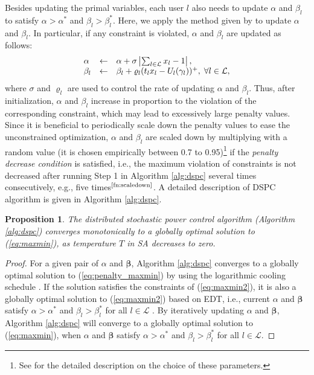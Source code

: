 \documentclass[10pt,journal,letterpaper,compsoc]{IEEEtran}
\newtheorem{prop}{\textbf{Proposition}}[section]
\begin{document}
{{Besides updating the primal variables, each user $l$ also needs to update $\alpha$ and $\beta_l$ to satisfy $\alpha>\alpha^*$ and $\beta_l>\beta^*_l$. Here, we apply the method given by \cite{chen:2008} to update $\alpha$ and $\beta_l$. In particular, if any constraint is violated, $\alpha$ and $\beta_l$ are updated as follows:
\begin{equation}\begin{array}
[c]{lll}\alpha&\leftarrow& \alpha+\sigma\left|\sum_{l\in\mathcal{L}} x_l-1\right|,
\\
\beta_l&\leftarrow& \beta_l+\varrho_l(t_lx_l- U_l(\gamma_l))^{+}, \; \forall l\in \mathcal{L},
\end{array}
\label{eq:penalty_variables}
\end{equation}
where $\sigma$ and $\varrho_l$ are used to control the rate of updating $\alpha$ and $\beta_l$. Thus, after initialization, $\alpha$ and $\beta_l$ increase in proportion to the violation of the corresponding constraint, which may lead to excessively large penalty values. Since it is beneficial to periodically scale down the penalty values to ease the unconstrained optimization, $\alpha$ and $\beta_l$ are scaled down by multiplying with a random value (it is chosen empirically between 0.7 to 0.95){\footnote{See \cite{chen:2008} for the detailed description on the choice of these parameters.\label{fn:scaledown}}} if the \emph{penalty decrease condition} is satisfied, i.e., the maximum violation of constraints is not decreased after running Step 1 in Algorithm \ref{alg:dspc} several times consecutively, e.g., five times$^\text{\ref{fn:scaledown}}$. A detailed description of DSPC algorithm is given in Algorithm \ref{alg:dspc}.

\begin{prop}
The distributed stochastic power control algorithm (Algorithm \ref{alg:dspc}) converges monotonically to a globally optimal solution to (\ref{eq:maxmin}), as temperature $T$ in SA decreases to zero.
\label{prop:dspc}
\end{prop}
\begin{proof}
For a given pair of $\alpha$ and $\boldsymbol{\beta}$, Algorithm \ref{alg:dspc} converges to a globally optimal solution to (\ref{eq:penalty_maxmin}) by using the logarithmic cooling schedule \cite{geman:1984,hajek:1988}. If the solution satisfies the constraints of (\ref{eq:maxmin2}), it is also a globally optimal solution to (\ref{eq:maxmin2}) based on EDT, i.e., current $\alpha$ and $\boldsymbol{\beta}$ satisfy $\alpha>\alpha^*$ and $\beta_l>\beta^*_l$ for all $l\in{\mathcal{L}}$ \cite{chen:2008}. By iteratively updating $\alpha$ and $\boldsymbol{\beta}$, Algorithm \ref{alg:dspc} will converge to a globally optimal solution to (\ref{eq:maxmin}), when $\alpha$ and $\boldsymbol{\beta}$ satisfy $\alpha>\alpha^*$ and $\beta_l>\beta^*_l$ for all $l\in{\mathcal{L}}$.
\end{proof}

}}
\end{document}
